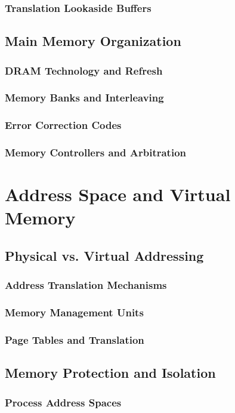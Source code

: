 \documentclass[12pt, oneside]{book}
\begin{document}
\subsubsection{Translation Lookaside Buffers}

\subsection{Main Memory Organization}
\subsubsection{DRAM Technology and Refresh}
\subsubsection{Memory Banks and Interleaving}
\subsubsection{Error Correction Codes}
\subsubsection{Memory Controllers and Arbitration}

\section{Address Space and Virtual Memory}
\subsection{Physical vs. Virtual Addressing}
\subsubsection{Address Translation Mechanisms}
\subsubsection{Memory Management Units}
\subsubsection{Page Tables and Translation}

\subsection{Memory Protection and Isolation}
\subsubsection{Process Address Spaces}
\end{document}
